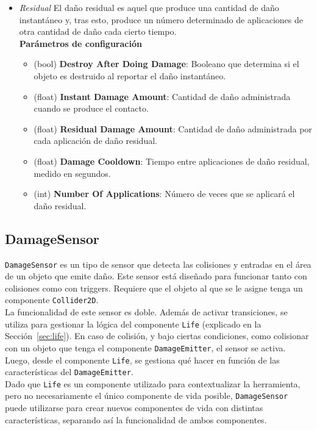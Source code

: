 \begin{itemize}
	\item \textit{Residual}
El daño residual es aquel que produce una cantidad de daño instantáneo y, tras esto, produce un número determinado de aplicaciones de otra cantidad de daño cada cierto tiempo.\\

\textbf{Parámetros de configuración}
	\begin{itemize}
	        \item (bool) \textbf{Destroy After Doing Damage}: Booleano que determina si el objeto es destruido al reportar el daño instantáneo.
	        \item (float) \textbf{Instant Damage Amount}: Cantidad de daño administrada cuando se produce el contacto.
	        \item (float) \textbf{Residual Damage Amount}: Cantidad de daño administrada por cada aplicación de daño residual.
	        \item (float) \textbf{Damage Cooldown}: Tiempo entre aplicaciones de daño residual, medido en segundos.
	        \item (int) \textbf{Number Of Applications}: Número de veces que se aplicará el daño residual.
	\end{itemize}
\end{itemize}
\subsection{DamageSensor}

\texttt{DamageSensor} es un tipo de sensor que detecta las colisiones y entradas en el área de un objeto que emite daño. Este sensor está diseñado para funcionar tanto con colisiones como con triggers. Requiere que el objeto al que se le asigne tenga un componente \texttt{Collider2D}.\\

La funcionalidad de este sensor es doble. Además de activar transiciones, se utiliza para gestionar la lógica del componente \texttt{Life} (explicado en la Sección~\ref{sec:life}). En caso de colisión, y bajo ciertas condiciones, como colisionar con un objeto que tenga el componente \texttt{DamageEmitter}, el sensor se activa. Luego, desde el componente \texttt{Life}, se gestiona qué hacer en función de las características del \texttt{DamageEmitter}.\\

Dado que \texttt{Life} es un componente utilizado para contextualizar la herramienta, pero no necesariamente el único componente de vida posible, \texttt{DamageSensor} puede utilizarse para crear nuevos componentes de vida con distintas características, separando así la funcionalidad de ambos componentes.\\

